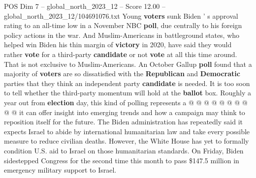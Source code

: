 \begin{textsample}{POS Dim 7 – global\_north\_2023\_12 – Score 12.00 – global\_north\_2023\_12/104691076.txt}
Young \textbf{voters} sunk Biden ' s approval rating to an all-time low in a November NBC \textbf{poll}, due centrally to his foreign policy actions in the war.
And Muslim-Americans in battleground states, who helped win Biden his thin margin of \textbf{victory} in 2020, have said they would rather \textbf{vote} for a third-party \textbf{candidate} or not \textbf{vote} at all this time around.
That is not exclusive to Muslim-Americans.
An October Gallup \textbf{poll} found that a majority of \textbf{voters} are so dissatisfied with the \textbf{Republican} and \textbf{Democratic} parties that they think an independent party \textbf{candidate} is needed.
It is too soon to tell whether the third-party momentum will hold at the \textbf{ballot} box.
Roughly a year out from \textbf{election} day, this kind of polling represents a @ @ @ @ @ @ @ @ @ @ it can offer insight into emerging trends and how a campaign may think to reposition itself for the future.
The Biden administration has repeatedly said it expects Israel to abide by international humanitarian law and take every possible measure to reduce civilian deaths.
However, the White House has yet to formally condition U.S. aid to Israel on those humanitarian standards.
On Friday, Biden sidestepped Congress for the second time this month to pass \$147.5 million in emergency military support to Israel.

\end{textsample}
